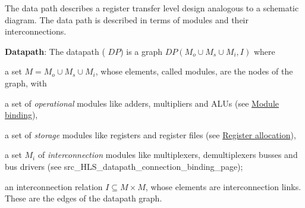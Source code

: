 The data path describes a register transfer level design analogous to a schematic diagram. The data path is described in terms of modules and their interconnections.

{\bfseries Datapath}\+: The datapath ( $DP$) is a graph $DP(M_o\cup M_s \cup M_i,I)$ where
\begin{DoxyItemize}
\item a set $M = M_o\cup M_s\cup M_i$, whose elements, called modules, are the nodes of the graph, with
\begin{DoxyItemize}
\item a set  of {\itshape operational} modules like adders, multipliers and A\+L\+Us (see \hyperlink{src_HLS_module_binding_page}{Module binding}),
\item a set  of {\itshape storage} modules like registers and register files (see \hyperlink{src_HLS_registerAllocation_page}{Register allocation}),
\item a set $M_i$ of {\itshape interconnection} modules like multiplexers, demultiplexers busses and bus drivers (see src\+\_\+\+H\+L\+S\+\_\+datapath\+\_\+connection\+\_\+binding\+\_\+page);
\end{DoxyItemize}
\item an interconnection relation $I\subseteq M\times M$, whose elements are interconnection links. These are the edges of the datapath graph. 
\end{DoxyItemize}
